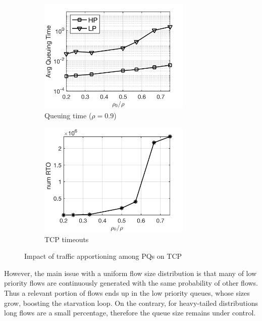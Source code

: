 \begin{figure}
	\centering
	\begin{subfigure}{.5\textwidth}
		\centering
		\includegraphics[width=0.8\textwidth]{Chapter4/Figures/qt_vs_thresh}
		\caption{Queuing time ($\rho=0.9$)}
		\label{fig:qt-vs-threshold}
	\end{subfigure}%
	\hfill
	\begin{subfigure}{.5\textwidth}
		\centering
		\includegraphics[width=0.8\textwidth]{Chapter4/Figures/rto_vs_thresh}
		\caption{TCP timeouts}
		\label{fig:num-rto}
	\end{subfigure}%
	\caption{Impact of traffic apportioning among PQs on TCP}
	\label{fig:uniform-traffic-sp-tcp}
\end{figure}%
However, the main issue with a uniform flow size distribution is that many of low priority flows are continuously generated with the same probability of other flows. Thus a relevant portion of flows ends up in the low priority queues, whose sizes grow, boosting the starvation loop. On the contrary, for heavy-tailed distributions long flows are a small percentage, therefore the queue size remains under control. \\
